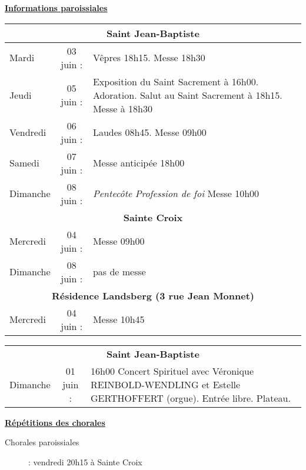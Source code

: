 \documentclass[11pt,a4paper]{article}
\newcommand*{\footer}{..}
\newcommand{\NewsItem}[1]{%
\vspace{3pt}
\underline{\textbf{#1}}
		  }
\begin{document}
\NewsItem{Informations paroissiales}

\begin{tabular} {lcp{8cm}}
\multicolumn{3}{c}{\textbf{Saint Jean-Baptiste} } \\ \hline
Mardi    & 03 juin : & Vêpres 18h15. Messe 18h30 \\ \hline
Jeudi    & 05 juin : & 
Exposition du Saint Sacrement à 16h00. Adoration. Salut au Saint Sacrement à 18h15. Messe à 18h30 
 \\ \hline
Vendredi & 06 juin : & Laudes 08h45. Messe 09h00 \\ \hline
Samedi   & 07 juin : & Messe anticipée 18h00 \\ \hline
Dimanche & 08 juin : & \emph{Pentecôte} \textit{Profession de foi} Messe 10h00 \\ \hline
\multicolumn{3}{c}{\textbf{Sainte Croix} } \\ \hline
Mercredi & 04 juin : & Messe 09h00 \\ \hline
Dimanche & 08 juin : & pas de messe \\ \hline
\multicolumn{3}{c}{\textbf{Résidence Landsberg (3 rue Jean Monnet)} } \\ \hline
Mercredi & 04 juin : & Messe 10h45 \\ \hline
\end{tabular}

\begin{framed}
\begin{tabular} {lcp{8cm}}
\multicolumn{3}{c}{\textbf{Saint Jean-Baptiste} } \\
Dimanche & 01 juin : & 16h00 Concert Spirituel avec Véronique REINBOLD-WENDLING et Estelle GERTHOFFERT (orgue). Entrée libre. Plateau.
\end{tabular}
\end{framed}


\NewsItem{Répétitions des chorales}
\begin{description}
\item[Chorales paroissiales] : vendredi 20h15 à Sainte Croix
\end{description}


\end{document}
